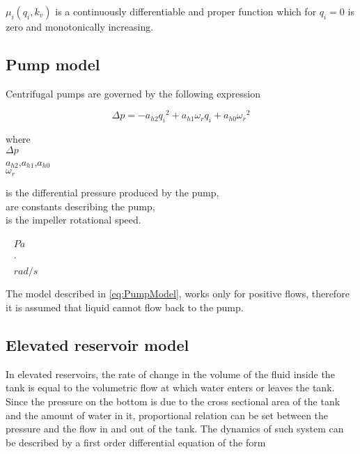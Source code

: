 $\mu_i(q_i,k_v)$ is a continuously differentiable and proper function which for $q_i = 0$ is zero and monotonically increasing.

\subsection{Pump model}
\label{pump_component}

Centrifugal pumps are governed by the following expression \cite{kallesoePHD}

\begin{equation}
  \Delta p = -a_{h2}{q_i}^2 + a_{h1} \omega_r q_i + a_{h0}{\omega_r}^2
  \label{eq:PumpModel}
\end{equation}

\begin{minipage}[t]{0.20\textwidth}
where\\
\hspace*{8mm} $\Delta p$ \\
\hspace*{8mm} $a_{h2}$,$a_{h1}$,$a_{h0}$ \\
\hspace*{8mm} $\omega_r$ 

\end{minipage}
\begin{minipage}[t]{0.68\textwidth}
\vspace*{2mm}
is the differential pressure produced by the pump,\\
are constants describing the pump,\\
is the impeller rotational speed.
\end{minipage}
\begin{minipage}[t]{0.10\textwidth}
\vspace*{2mm}
\textcolor{White}{te}$\unit{Pa}$\\
\textcolor{White}{te}$\unit{\cdot}$\\
\textcolor{White}{te}$\unit{rad/s}$
\end{minipage}  

The model described in \eqref{eq:PumpModel}, works only for positive flows, therefore it is assumed that liquid cannot flow back to the pump. 

\subsection{Elevated reservoir model}
\label{elevatedreservoir_component}

In elevated reservoirs, the rate of change in the volume of the fluid inside the tank is equal to the volumetric flow at which water enters or leaves the tank. Since the pressure on the bottom is due to the cross sectional area of the tank and the amount of water in it, proportional relation can be set between the pressure and the flow in and out of the tank. The dynamics of such system can be described by a first order differential equation of the form

